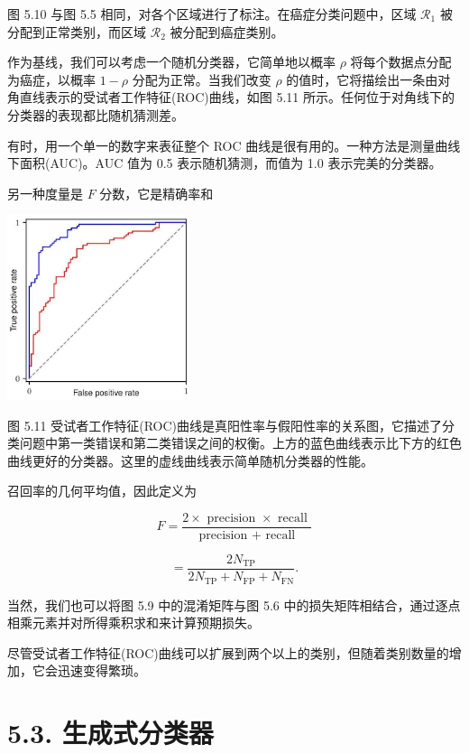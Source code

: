 \documentclass[10pt]{report}
\begin{document}
图 5.10 与图 5.5 相同，对各个区域进行了标注。在癌症分类问题中，区域 \({\mathcal{R}}_{1}\) 被分配到正常类别，而区域 \({\mathcal{R}}_{2}\) 被分配到癌症类别。

作为基线，我们可以考虑一个随机分类器，它简单地以概率 \(\rho\) 将每个数据点分配为癌症，以概率 \(1 - \rho\) 分配为正常。当我们改变 \(\rho\) 的值时，它将描绘出一条由对角直线表示的受试者工作特征(ROC)曲线，如图 5.11 所示。任何位于对角线下的分类器的表现都比随机猜测差。

有时，用一个单一的数字来表征整个 ROC 曲线是很有用的。一种方法是测量曲线下面积(AUC)。AUC 值为 0.5 表示随机猜测，而值为 1.0 表示完美的分类器。

另一种度量是 \(F\) 分数，它是精确率和

\begin{center}
\includegraphics[max width=0.4\textwidth]{images/0194e279-9b28-703a-88f4-c3ac21e2010d_169_941_345_601_610_0.jpg}
\end{center}
\hspace*{3em} 

图 5.11 受试者工作特征(ROC)曲线是真阳性率与假阳性率的关系图，它描述了分类问题中第一类错误和第二类错误之间的权衡。上方的蓝色曲线表示比下方的红色曲线更好的分类器。这里的虚线曲线表示简单随机分类器的性能。

召回率的几何平均值，因此定义为

\[
F = \frac{2 \times  \text{ precision } \times  \text{ recall }}{\text{ precision } + \text{ recall }} \tag{5.38}
\]

\[
= \frac{2{N}_{\mathrm{{TP}}}}{2{N}_{\mathrm{{TP}}} + {N}_{\mathrm{{FP}}} + {N}_{\mathrm{{FN}}}}. \tag{5.39}
\]

当然，我们也可以将图 5.9 中的混淆矩阵与图 5.6 中的损失矩阵相结合，通过逐点相乘元素并对所得乘积求和来计算预期损失。

尽管受试者工作特征(ROC)曲线可以扩展到两个以上的类别，但随着类别数量的增加，它会迅速变得繁琐。

\section*{5.3. 生成式分类器}
\end{document}

